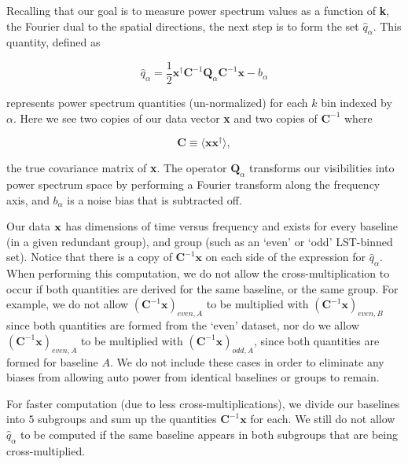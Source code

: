 \documentclass[preprint2,numberedappendix,tighten,twocolappendix]{aastex6}  %
\begin{document}
Recalling that our goal is to measure power spectrum values as a function of \textbf{k}, the Fourier dual to the spatial directions, the next step is to form the set $\hat{q}_{\alpha}$. This quantity, defined as  

\begin{equation}
\label{eq:qhat}
\hat{q}_{\alpha} = \frac{1}{2}\textbf{x}^{\dagger}\textbf{C}^{-1}\textbf{Q}_{\alpha}\textbf{C}^{-1}\textbf{x}-b_{\alpha}
\end{equation}

\noindent represents power spectrum quantities (un-normalized) for each $k$ bin indexed by $\alpha$. Here we see two copies of our data vector \textbf{x} and two copies of $\textbf{C}^{-1}$ where 

\begin{equation}
\textbf{C} \equiv \langle\textbf{x}\textbf{x}^{\dagger}\rangle,
\end{equation}

\noindent the true covariance matrix of \textbf{x}. The operator $\textbf{Q}_{\alpha}$ transforms our visibilities into power spectrum space by performing a Fourier transform along the frequency axis, and $b_{\alpha}$ is a noise bias that is subtracted off.

Our data $\bf{x}$ has dimensions of time versus frequency and exists for every baseline (in a given redundant group), and group (such as an `even' or `odd' LST-binned set). Notice that there is a copy of $\textbf{C}^{-1}\textbf{x}$ on each side of the expression for $\hat{q}_{\alpha}$. When performing this computation, we do not allow the cross-multiplication to occur if both quantities are derived for the same baseline, or the same group. For example, we do not allow $(\textbf{C}^{-1}\textbf{x})_{even,A}$ to be multiplied with $(\textbf{C}^{-1}\textbf{x})_{even,B}$ since both quantities are formed from the `even' dataset, nor do we allow $(\textbf{C}^{-1}\textbf{x})_{even,A}$ to be multiplied with $(\textbf{C}^{-1}\textbf{x})_{odd,A}$, since both quantities are formed for baseline $A$. We do not include these cases in order to eliminate any biases from allowing auto power from identical baselines or groups to remain.

For faster computation (due to less cross-multiplications), we divide our baselines into $5$ subgroups and sum up the quantities $\textbf{C}^{-1}\textbf{x}$ for each. We still do not allow $\hat{q}_{\alpha}$ to be computed if the same baseline appears in both subgroups that are being cross-multiplied. 
\end{document}
